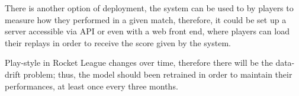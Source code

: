 There is another option of deployment, the system can be used to by players to measure how they performed in a given match, therefore, it could be set up a server accessible via API or even with a web front end, where players can load their replays in order to receive the score given by the system.

Play-style in Rocket League changes over time, therefore there will be the data-drift problem; thus, the model should been retrained in order to maintain their performances, at least once every three months. 
